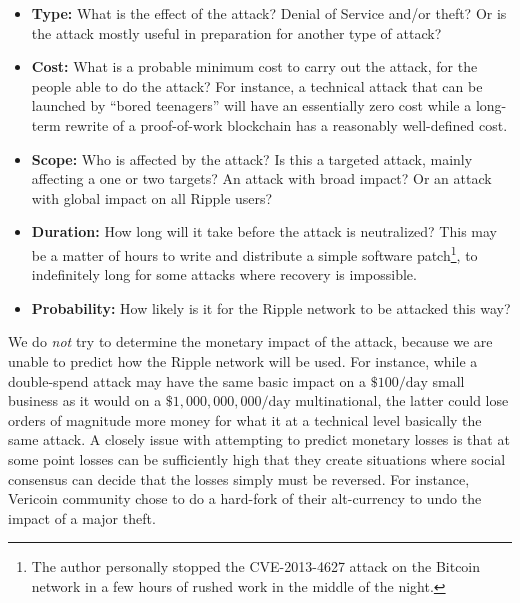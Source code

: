 \documentclass{article}
\begin{document}
\begin{itemize}

    \item \textbf{Type:} What is the effect of the attack? Denial of Service
          and/or theft? Or is the attack mostly useful in preparation for another
          type of attack?

    \item \textbf{Cost:} What is a probable minimum cost to carry out the attack, for
          the people able to do the attack? For instance, a technical attack
          that can be launched by ``bored teenagers'' will have an essentially
          zero cost while a long-term rewrite of a proof-of-work blockchain has
          a reasonably well-defined cost.

    \item \textbf{Scope:} Who is affected by the attack? Is this a targeted attack,
          mainly affecting a one or two targets? An attack with broad impact? Or
          an attack with global impact on all Ripple users?

    \item \textbf{Duration:} How long will it take before the attack is
          neutralized?  This may be a matter of hours to write and distribute a
          simple software patch\footnote{The author personally stopped the
          CVE-2013-4627 attack on the Bitcoin network in a few hours of rushed
          work in the middle of the night.}, to indefinitely long for some
          attacks where recovery is impossible.

    \item \textbf{Probability:} How likely is it for the Ripple network to be
          attacked this way?

\end{itemize}

We do \emph{not} try to determine the monetary impact of the attack, because we
are unable to predict how the Ripple network will be used. For instance, while
a double-spend attack may have the same basic impact on a $\$100/\text{day}$
small business as it would on a $\$1,000,000,000/\text{day}$ multinational, the
latter could lose orders of magnitude more money for what it at a technical
level basically the same attack. A closely issue with attempting to predict
monetary losses is that at some point losses can be sufficiently high that they
create situations where social consensus can decide that the losses simply must
be reversed. For instance, Vericoin community chose to do a hard-fork of their
alt-currency to undo the impact of a major theft.\cite{coindesk-vericoin}
\end{document}

